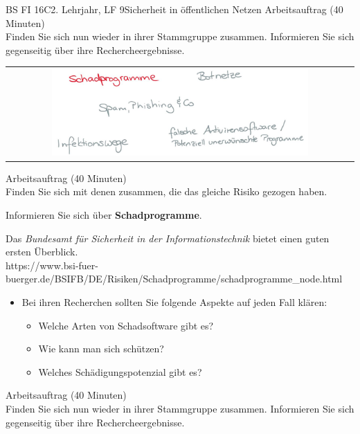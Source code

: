 \documentclass[oneside,openany,headings=optiontotoc,11pt,numbers=noenddot]{scrreprt}
\begin{document}
\begin{worksheet}{BS FI 16C}{2. Lehrjahr, LF 9}{Sicherheit in öffentlichen Netzen}
		\color{codegray}Arbeitsauftrag (40 Minuten)\\
		\color{black}
		Finden Sie sich nun wieder in ihrer Stammgruppe zusammen. Informieren Sie sich gegenseitig über ihre Rechercheergebnisse.
	
		\newpage
		\setcounter{page}{1}
		\begin{framed}
			\begin{tabular}{lcr}
				& \includegraphics[width=0.8\textwidth]{Bilder/Schadprogramme.jpg} & \\
			\end{tabular}
		\end{framed}
		\color{codegray}Arbeitsauftrag (40 Minuten)\\
		\color{black}
		Finden Sie sich mit denen zusammen, die das gleiche Risiko gezogen haben.
		\par
		\bigskip
		\noindent
		Informieren Sie sich über \textbf{Schadprogramme}.
		\par\bigskip\noindent
		Das \textit{Bundesamt für Sicherheit in der Informationstechnik} bietet einen guten ersten Überblick.\\
		\small{\color{codegray}https://www.bsi-fuer-buerger.de/BSIFB/DE/Risiken/Schadprogramme/schadprogramme\_node.html}
		\normalsize
		\begin{itemize}
			\item[] Bei ihren Recherchen sollten Sie folgende Aspekte auf jeden Fall klären:
			\begin{itemize}
				\item Welche Arten von Schadsoftware gibt es?
				\item Wie kann man sich schützen?
				\item Welches Schädigungspotenzial gibt es?
			\end{itemize}
		\end{itemize}
		\par
		\bigskip
		\noindent
		
		\color{codegray}Arbeitsauftrag (40 Minuten)\\
		\color{black}
		Finden Sie sich nun wieder in ihrer Stammgruppe zusammen. Informieren Sie sich gegenseitig über ihre Rechercheergebnisse.
	

\end{worksheet}
\end{document}
